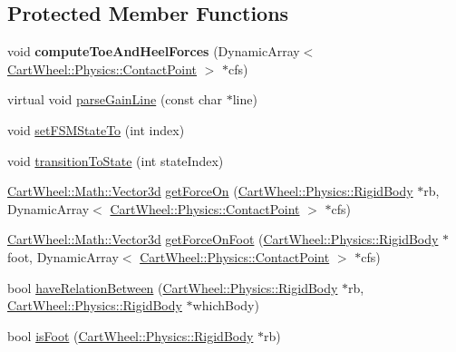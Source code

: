 \subsection*{Protected Member Functions}
\begin{DoxyCompactItemize}
\item 
\hypertarget{classCartWheel_1_1Core_1_1SimBiController_ae1e47860e3d50d2df9b265df9c2f91e6}{
void {\bfseries computeToeAndHeelForces} (DynamicArray$<$ \hyperlink{classCartWheel_1_1Physics_1_1ContactPoint}{CartWheel::Physics::ContactPoint} $>$ $\ast$cfs)}
\label{classCartWheel_1_1Core_1_1SimBiController_ae1e47860e3d50d2df9b265df9c2f91e6}

\item 
virtual void \hyperlink{classCartWheel_1_1Core_1_1SimBiController_a9508198fc8cc2f2ceb9c1edef8ed0a45}{parseGainLine} (const char $\ast$line)
\item 
void \hyperlink{classCartWheel_1_1Core_1_1SimBiController_ae19bf9de3be68e38c4d5a834075031f4}{setFSMStateTo} (int index)
\item 
void \hyperlink{classCartWheel_1_1Core_1_1SimBiController_a3bde303de6008f855cc8479eb0519cb9}{transitionToState} (int stateIndex)
\item 
\hyperlink{classCartWheel_1_1Math_1_1Vector3d}{CartWheel::Math::Vector3d} \hyperlink{classCartWheel_1_1Core_1_1SimBiController_a5ccf149c4539ab094ac493288b412478}{getForceOn} (\hyperlink{classCartWheel_1_1Physics_1_1RigidBody}{CartWheel::Physics::RigidBody} $\ast$rb, DynamicArray$<$ \hyperlink{classCartWheel_1_1Physics_1_1ContactPoint}{CartWheel::Physics::ContactPoint} $>$ $\ast$cfs)
\item 
\hyperlink{classCartWheel_1_1Math_1_1Vector3d}{CartWheel::Math::Vector3d} \hyperlink{classCartWheel_1_1Core_1_1SimBiController_acbdd73768f1429479ca16efdce9a1a90}{getForceOnFoot} (\hyperlink{classCartWheel_1_1Physics_1_1RigidBody}{CartWheel::Physics::RigidBody} $\ast$foot, DynamicArray$<$ \hyperlink{classCartWheel_1_1Physics_1_1ContactPoint}{CartWheel::Physics::ContactPoint} $>$ $\ast$cfs)
\item 
bool \hyperlink{classCartWheel_1_1Core_1_1SimBiController_a13618b2a089465535686d18e58856a08}{haveRelationBetween} (\hyperlink{classCartWheel_1_1Physics_1_1RigidBody}{CartWheel::Physics::RigidBody} $\ast$rb, \hyperlink{classCartWheel_1_1Physics_1_1RigidBody}{CartWheel::Physics::RigidBody} $\ast$whichBody)
\item 
bool \hyperlink{classCartWheel_1_1Core_1_1SimBiController_a2eb95d96778348a0ce085a4750f4bdc0}{isFoot} (\hyperlink{classCartWheel_1_1Physics_1_1RigidBody}{CartWheel::Physics::RigidBody} $\ast$rb)

\end{DoxyCompactItemize}
